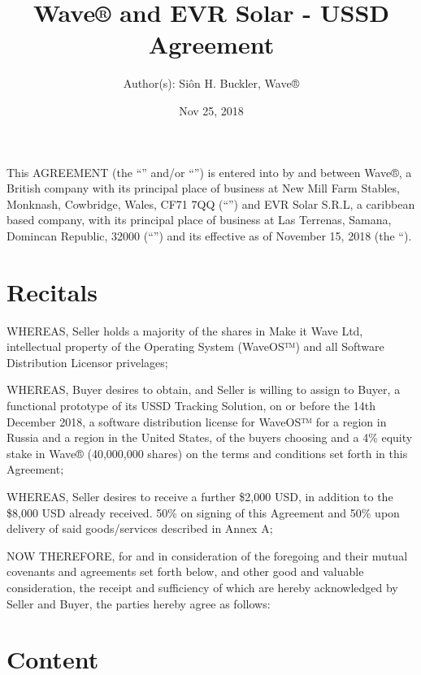 \documentclass[letterpaper,10pt,english]{sphinxmanual}
\title{Wave® and EVR Solar - USSD Agreement}
\date{Nov 25, 2018}
\author{Author(s): Siôn H. Buckler, Wave®}
\begin{document}
\pagestyle{empty}
\maketitle
\pagestyle{plain}
\sphinxtableofcontents
\pagestyle{normal}
\label{\detokenize{index::doc}}


This AGREEMENT (the “” and/or “”) is entered into by and between Wave®, a British company with its principal place of business at New Mill Farm Stables, Monknash, Cowbridge, Wales, CF71 7QQ (“”)  and EVR Solar S.R.L, a caribbean based company, with its principal place of business at Las Terrenas, Samana, Domincan Republic, 32000  (“”) and its effective as of November 15, 2018 (the “).


\chapter{Recitals}
\label{\detokenize{index:recitals}}
WHEREAS, Seller holds a majority of the shares in Make it Wave Ltd, intellectual property of the Operating System (WaveOS™) and all Software Distribution Licensor privelages;

WHEREAS, Buyer desires to obtain, and Seller is willing to assign to Buyer, a functional prototype of its USSD Tracking Solution, on or before the 14th December 2018, a software distribution license for WaveOS™ for a region in Russia and a region in the United States, of the buyers choosing and a 4\% equity stake in Wave® (40,000,000 shares) on the terms and conditions set forth in this Agreement;

WHEREAS, Seller desires to receive a further \$2,000 USD, in addition to the \$8,000 USD already received. 50\% on signing of this Agreement and 50\% upon delivery of said goods/services described in Annex A;

NOW THEREFORE, for and in consideration of the foregoing and their mutual covenants and agreements set forth below, and other good and valuable consideration, the receipt and sufficiency of which are hereby acknowledged by Seller and Buyer, the parties hereby agree as follows:


\chapter{Content}
\label{\detokenize{index:content}}
\end{document}
